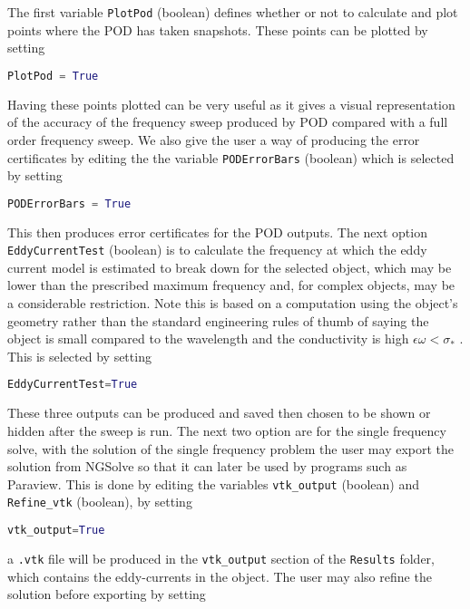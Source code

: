 \noindent
The first variable \texttt{PlotPod} (boolean) defines whether or not to calculate and plot points where the POD has taken snapshots. These points can be plotted by setting
\begin{lstlisting}[language=Python]
PlotPod = True
\end{lstlisting}
Having these points plotted can be very useful as it gives a visual representation of the accuracy of the frequency sweep produced by POD compared with a full order frequency sweep. We also give the user a way of producing the error certificates by editing the the variable \texttt{PODErrorBars} (boolean) which is selected by setting
\begin{lstlisting}[language=Python]
PODErrorBars = True
\end{lstlisting}
This then produces error certificates for the POD outputs. The next option \texttt{EddyCurrentTest} (boolean) is to calculate the frequency at which the eddy current model is estimated to break down for the selected object, which may be lower than the prescribed maximum frequency and, for complex objects, may be a considerable restriction. Note this is based on a computation using the object's geometry rather than the standard engineering rules of thumb of saying the object is small compared to the wavelength and the conductivity is high  $\epsilon \omega < \sigma_*$ \cite{schmidt2008estimating}. This is selected by setting
\begin{lstlisting}[language=Python]
EddyCurrentTest=True
\end{lstlisting}
These three outputs can be produced and saved then chosen to be shown or hidden after the sweep is run. The next two option are for the single frequency solve, with the solution of the single frequency problem the user may export the solution from NGSolve so that it can later be used by programs such as Paraview. This is done by editing the variables \texttt{vtk\_output} (boolean) and \texttt{Refine\_vtk} (boolean), by setting
\begin{lstlisting}[language=Python]
vtk_output=True
\end{lstlisting}
a \texttt{.vtk} file will be produced in the \texttt{vtk\_output} section of the \texttt{Results} folder, which contains the eddy-currents in the object. The user may also refine the solution before exporting by setting
